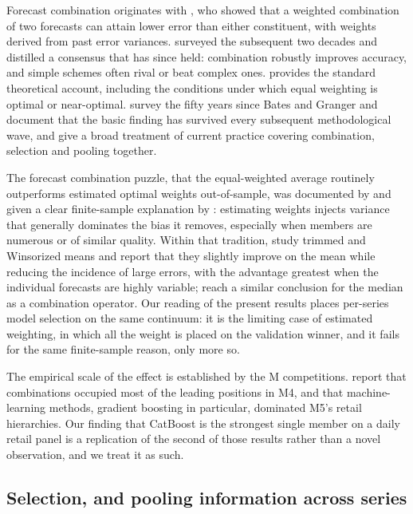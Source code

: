 \documentclass[11pt]{article}
\begin{document}
Forecast combination originates with \citet{bates1969}, who showed that a weighted combination of two forecasts can attain lower error than either constituent, with weights derived from past error variances. \citet{clemen1989} surveyed the subsequent two decades and distilled a consensus that has since held: combination robustly improves accuracy, and simple schemes often rival or beat complex ones. \citet{timmermann2006} provides the standard theoretical account, including the conditions under which equal weighting is optimal or near-optimal. \citet{wang2023} survey the fifty years since Bates and Granger and document that the basic finding has survived every subsequent methodological wave, and \citet{petropoulos2022} give a broad treatment of current practice covering combination, selection and pooling together.

The forecast combination puzzle, that the equal-weighted average routinely outperforms estimated optimal weights out-of-sample, was documented by \citet{stock2004} and given a clear finite-sample explanation by \citet{smith2009}: estimating weights injects variance that generally dominates the bias it removes, especially when members are numerous or of similar quality. Within that tradition, \citet{jose2008} study trimmed and Winsorized means and report that they slightly improve on the mean while reducing the incidence of large errors, with the advantage greatest when the individual forecasts are highly variable; \citet{kourentzes2019} reach a similar conclusion for the median as a combination operator. Our reading of the present results places per-series model selection on the same continuum: it is the limiting case of estimated weighting, in which all the weight is placed on the validation winner, and it fails for the same finite-sample reason, only more so.

The empirical scale of the effect is established by the M competitions. \citet{makridakis2020} report that combinations occupied most of the leading positions in M4, and \citet{makridakis2022} that machine-learning methods, gradient boosting in particular, dominated M5's retail hierarchies. Our finding that CatBoost is the strongest single member on a daily retail panel is a replication of the second of those results rather than a novel observation, and we treat it as such.

\subsection{Selection, and pooling information across series}
\end{document}
